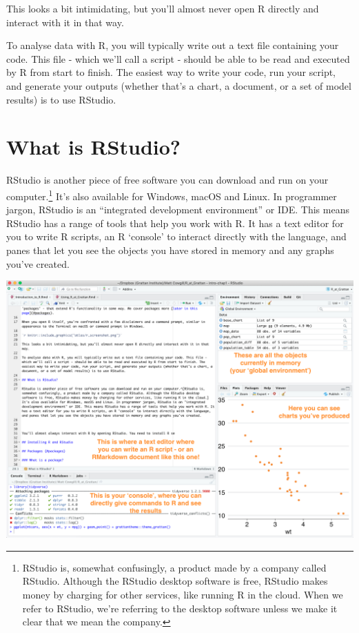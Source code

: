 \documentclass[]{book}
\let\rmarkdownfootnote\footnote%
\def\footnote{\protect\rmarkdownfootnote}
\begin{document}
This looks a bit intimidating, but you'll almost never open R directly and interact with it in that way.

To analyse data with R, you will typically write out a text file containing your code. This file - which we'll call a script - should be able to be read and executed by R from start to finish. The easiest way to write your code, run your script, and generate your outputs (whether that's a chart, a document, or a set of model results) is to use RStudio.

\hypertarget{what-is-rstudio}{%
\section{What is RStudio?}\label{what-is-rstudio}}

RStudio is another piece of free software you can download and run on your computer.\footnote{RStudio is, somewhat confusingly, a product made by a company called RStudio. Although the RStudio desktop software is free, RStudio makes money by charging for other services, like running R in the cloud. When we refer to RStudio, we're referring to the desktop software unless we make it clear that we mean the company.} It's also available for Windows, macOS and Linux. In programmer jargon, RStudio is an ``integrated development environment'' or IDE. This means RStudio has a range of tools that help you work with R. It has a text editor for you to write R scripts, an R `console' to interact directly with the language, and panes that let you see the objects you have stored in memory and any graphs you've created.

\includegraphics[width=18.4in]{atlas/rstudio_screenshot}
\end{document}
